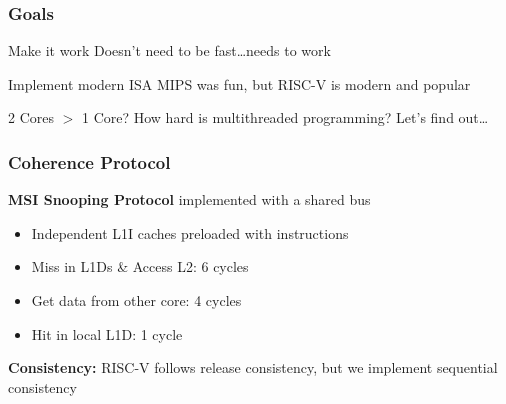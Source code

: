 \documentclass{beamer}
\begin{document}
\begin{frame}
\frametitle{Goals}



\begin{exampleblock}{Make it work}
  Doesn't need to be fast\dots needs to work
\end{exampleblock}

\begin{exampleblock}{Implement modern ISA}
  MIPS was fun, but RISC-V is modern and popular
\end{exampleblock}

\begin{exampleblock}{2 Cores $>$ 1 Core?}
  How hard is multithreaded programming? Let's find out\dots 
\end{exampleblock}





\end{frame}


\begin{frame}
  \frametitle{Coherence Protocol}
  
  \begin{tcolorbox}[colback=blue!5!white,colframe=blue!75!black]
    \begin{center}
      \textbf{MSI Snooping Protocol} implemented with a shared bus 
    \end{center}
  \end{tcolorbox}

  \begin{itemize} 
    \item Independent L1I caches preloaded with instructions
    \item Miss in L1Ds \& Access L2: 6 cycles
    \item Get data from other core: 4 cycles
    \item Hit in local L1D: 1 cycle 
  \end{itemize}

  \begin{tcolorbox}[colback=PMS 166!15!white,colframe=PMS 166!100!white]
    \begin{center}
      \textbf{Consistency:} RISC-V follows release consistency, but we implement sequential consistency
    \end{center}
  \end{tcolorbox}

\end{frame}
\end{document}
